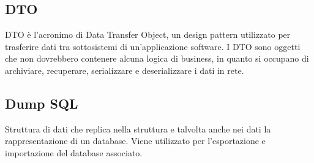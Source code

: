 \subsection*{DTO}
\par DTO è l'acronimo di Data Transfer Object, un design pattern utilizzato per trasferire dati tra sottosistemi di un'applicazione software. I DTO sono oggetti che non dovrebbero contenere alcuna logica di business, in quanto si occupano di archiviare, recuperare, serializzare e deserializzare i dati in rete.

\vspace{2em}
\subsection*{Dump SQL}
\par Struttura di dati che replica nella struttura e talvolta anche nei dati la rappresentazione di un database. Viene utilizzato per l'esportazione e importazione del database associato.
